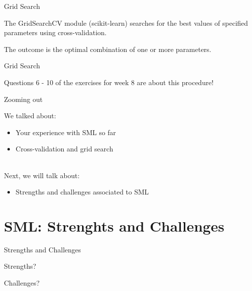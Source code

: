 \documentclass[handout]{beamer}
\begin{document}
\begin{frame}{Grid Search}
	
The GridSearchCV module (scikit-learn) searches for the best values of specified parameters using cross-validation.

The outcome is the optimal combination of one or more parameters.
	
\end{frame}


\begin{frame}{Grid Search}
	
Questions 6 - 10 of the exercises for week 8 are about this procedure!

\end{frame}



\begin{frame}{Zooming out} 
	
	We talked about:
	\begin{itemize}
		\item Your experience with SML so far
		\item Cross-validation and grid search \\\
	\end{itemize}
	
	Next, we will talk about:
	\begin{itemize}
		\item Strengths and challenges associated to SML
	\end{itemize}
	
\end{frame}


\section{SML: Strenghts and Challenges}


\begin{frame}{Strengths and Challenges} 
	
Strengths?

	
Challenges?

\end{frame}
\end{document}

